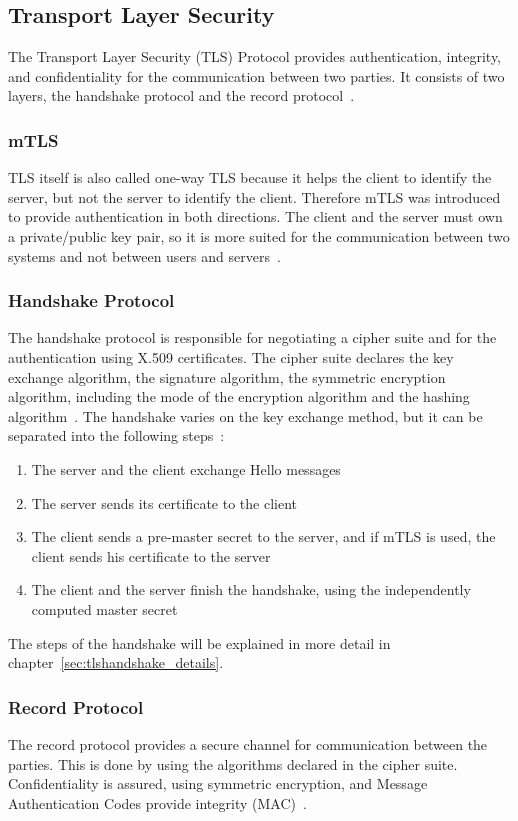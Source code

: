 \subsection{Transport Layer Security}
The Transport Layer Security (TLS) Protocol provides authentication, integrity, and confidentiality for the communication between two parties.
It consists of two layers, the handshake protocol and the record protocol~\cite{turnertls}.

\subsubsection{mTLS} \label{sec:mtls}
TLS itself is also called one-way TLS because it helps the client to identify the server, but not the server to identify the client.
Therefore mTLS was introduced to provide authentication in both directions.
The client and the server must own a private/public key pair, so it is more suited for the communication between two systems and not between users and servers~\cite{dias2020microservices}. 

\subsubsection{Handshake Protocol}
The handshake protocol is responsible for negotiating a cipher suite and for the authentication using X.509 certificates.
The cipher suite declares the key exchange algorithm, the signature algorithm, the symmetric encryption algorithm, including the mode of the encryption algorithm and the hashing algorithm~\cite{turnertls, kurbatov2021design}.
The handshake varies on the key exchange method, but it can be separated into the following steps~\cite{krawczyk2013security}:
\begin{enumerate}
    \item The server and the client exchange Hello messages
    \item The server sends its certificate to the client
    \item The client sends a pre-master secret to the server, and if mTLS is used, the client sends his certificate to the server
    \item The client and the server finish the handshake, using the independently computed master secret
\end{enumerate}
The steps of the handshake will be explained in more detail in chapter~\ref{sec:tlshandshake_details}.

\subsubsection{Record Protocol}
The record protocol provides a secure channel for communication between the parties.
This is done by using the algorithms declared in the cipher suite.
Confidentiality is assured, using symmetric encryption, and Message Authentication Codes provide integrity (MAC)~\cite{kurbatov2021design, krawczyk2013security}.

